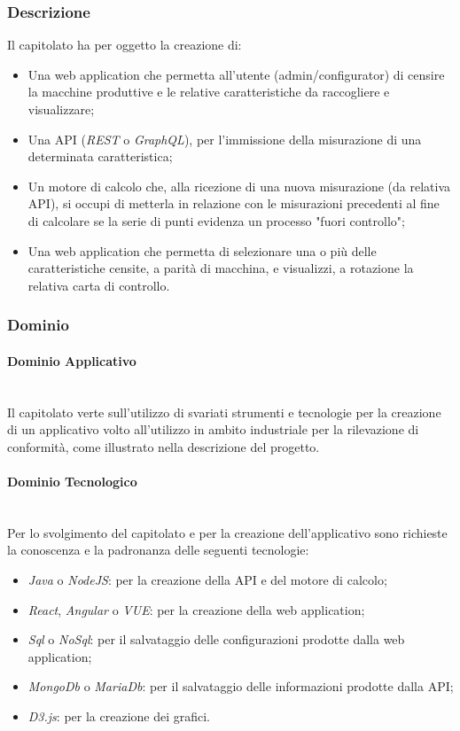 \documentclass[11pt]{article}
\begin{document}
    \subsubsection{Descrizione}
    Il capitolato ha per oggetto la creazione di: 
	\begin{itemize}
		\item Una web application che permetta all'utente (admin/configurator) di censire la macchine produttive e
		le relative caratteristiche da raccogliere e visualizzare;
		\item Una API (\textit{REST} o \textit{GraphQL}), per l'immissione della misurazione di una determinata
		caratteristica;
		\item Un motore di calcolo che, alla ricezione di una nuova misurazione (da relativa API), si occupi di metterla in
		relazione con le misurazioni precedenti al fine di calcolare se la serie di punti evidenza un processo "fuori controllo";
		\item Una web application che permetta di selezionare una o più delle caratteristiche censite, a parità di macchina,
		e visualizzi, a rotazione la relativa carta di controllo.
	\end{itemize}	    

    \subsubsection{Dominio}
        \paragraph{Dominio Applicativo}~\\
        
		\noindent
        Il capitolato verte sull'utilizzo di svariati strumenti e tecnologie per la creazione di un applicativo volto all'utilizzo
        in ambito industriale per la rilevazione di conformità, come illustrato nella descrizione del progetto.
        
        \paragraph{Dominio Tecnologico}~\\

		\noindent
        Per lo svolgimento del capitolato e per la creazione dell'applicativo sono richieste la conoscenza e la padronanza delle
        seguenti tecnologie:
        \begin{itemize}
            \item \textit{Java} o \textit{NodeJS}: per la creazione della API e del motore di calcolo;
            \item \textit{React}, \textit{Angular} o \textit{VUE}: per la creazione della web application;
            \item \textit{Sql} o \textit{NoSql}: per il salvataggio delle configurazioni prodotte dalla web application;
            \item \textit{MongoDb} o \textit{MariaDb}: per il salvataggio delle informazioni prodotte dalla API;
            \item \textit{D3.js}: per la creazione dei grafici.
        \end{itemize}
    
\end{document}
